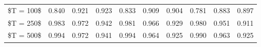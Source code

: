 % 
\begin{tabular}{cccccccccc}
  \hline
  \hline
\$T = 100\$ & 0.840 & 0.921 & 0.923 & 0.833 & 0.909 & 0.904 & 0.781 & 0.883 & 0.897 \\ 
  \$T = 250\$ & 0.983 & 0.972 & 0.942 & 0.981 & 0.966 & 0.929 & 0.980 & 0.951 & 0.911 \\ 
  \$T = 500\$ & 0.994 & 0.972 & 0.941 & 0.994 & 0.964 & 0.925 & 0.990 & 0.963 & 0.925 \\ 
   \hline
\end{tabular}
